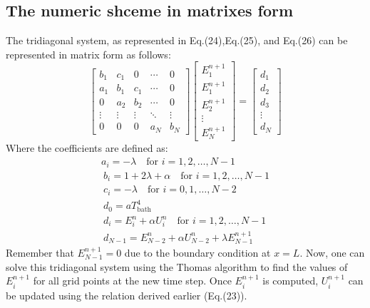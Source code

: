 \documentclass{article}
\begin{document}
\subsection*{The numeric shceme in matrixes form}
The tridiagonal system, as represented in Eq.(24),Eq.(25), and Eq.(26) can be represented in matrix form as follows:
\begin{equation}
\begin{bmatrix}
b_1 & c_1 & 0 & \cdots & 0 \\  
a_1 & b_1 & c_1 & \cdots & 0 \\
0 & a_2 & b_2 & \cdots & 0 \\
\vdots & \vdots & \vdots & \ddots & \vdots \\
0 & 0 & 0 & a_{N} & b_{N}
\end{bmatrix}
\begin{bmatrix}
E_1^{n+1} \\
E_1^{n+1} \\
E_2^{n+1} \\
\vdots \\
E_{N}^{n+1}
\end{bmatrix}
=
\begin{bmatrix}
d_1 \\
d_2 \\
d_3 \\
\vdots \\
d_{N}
\end{bmatrix}
\end{equation}
Where the coefficients are defined as:
\begin{gather*}
a_i = -\lambda \quad \text{for } i = 1,2,\ldots,N-1 \\\
b_i = 1 + 2\lambda + \alpha \quad \text{for } i = 1,2,\ldots,N-1 \\\
c_i = -\lambda \quad \text{for } i = 0,1,\ldots,N-2 \\\
d_0 = a T_{\text{bath}}^4 \\\
d_i = E_i^n + \alpha U_i^n \quad \text{for } i = 1,2,\ldots,N-1 \\\
d_{N-1} = E_{N-2}^n + \alpha U_{N-2}^n + \lambda E_{N-1}^{n+1} 
\end{gather*}
Remember that $E_{N-1}^{n+1} = 0$ due to the boundary condition at $x=L$. Now, 
one can solve this tridiagonal system using the Thomas algorithm to 
find the values of $E_i^{n+1}$ for all grid points at the new time step. 
Once $E_i^{n+1}$ is computed, $U_i^{n+1}$ can be updated using the relation derived earlier (Eq.(23)).
\end{document}
